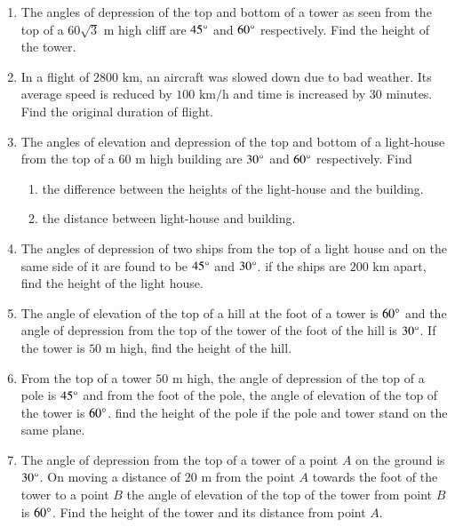 \documentclass[journal,12pt,onecolumn]{IEEEtran}
\theoremstyle{remark}
\begin{document}
\begin{enumerate}
\item The angles of depression of the top and bottom of a tower as seen from the top of a $60\sqrt 3 \text{ m}$ high cliff are $45\degree$ and $60\degree$ respectively. Find the height of the tower.\\
\item In a flight of $2800 \text{ km}$, an aircraft was slowed down due to bad weather. Its average speed is reduced by $100 \text{ km/h}$ and time is increased by $30$ minutes. Find the original duration of flight.\\
\item The angles of elevation and depression of the top and bottom of a light-house from the top of a $60 \text{ m}$ high building are $30\degree$ and $60\degree$ respectively. Find\\
\begin{enumerate}[label=\Roman*.]
\item the difference between the heights of the light-house and the building.\\
\item the distance between light-house and building.\\
\end{enumerate}
\item The angles of depression of two ships from the top of a light house and on the same side of it are found to be $45\degree$ and $30\degree$. if the ships are $200 \text{ km}$ apart, find the height of the light house.\\
\item The angle of elevation of the top of a hill at the foot of a tower is $60\degree$ and the angle of depression from the top of the tower of the foot of the hill is $30\degree$. If the tower is $50\text{ m}$ high, find the height of the hill.\\
\item From the top of a tower $50\text{ m}$ high, the angle of depression of the top of a pole is $45\degree$ and from the foot of the pole, the angle of elevation of the top of the tower is $60\degree$. find the height of the pole if the pole and tower stand on the same plane.\\
\item The angle of depression from the top of a tower of a point $A$ on the ground is $30\degree$. On moving a distance of $20\text{ m}$ from the point $A$ towards the foot of the tower to a point $B$ the angle of elevation of the top of the tower from point $B$ is $60\degree$. Find the height of the tower and its distance from point $A$.
\end{enumerate}
\end{document}

